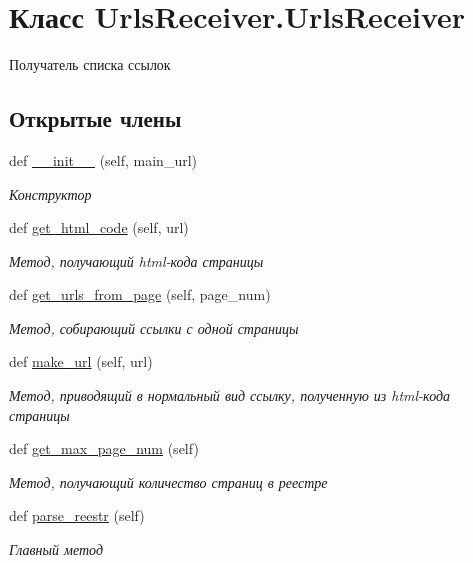 \hypertarget{classUrlsReceiver_1_1UrlsReceiver}{}\section{Класс Urls\+Receiver.\+Urls\+Receiver}
\label{classUrlsReceiver_1_1UrlsReceiver}


Получатель списка ссылок  


\subsection*{Открытые члены}
\begin{DoxyCompactItemize}
\item 
def \hyperlink{classUrlsReceiver_1_1UrlsReceiver_ae4ba1b935dce3bd30912583beca32aff}{\+\_\+\+\_\+init\+\_\+\+\_\+} (self, main\+\_\+url)
\begin{DoxyCompactList}\small\item\em Конструктор \end{DoxyCompactList}\item 
def \hyperlink{classUrlsReceiver_1_1UrlsReceiver_a448316919bfe59e35942edc34f2b674b}{get\+\_\+html\+\_\+code} (self, url)
\begin{DoxyCompactList}\small\item\em Метод, получающий html-\/кода страницы \end{DoxyCompactList}\item 
def \hyperlink{classUrlsReceiver_1_1UrlsReceiver_ace2cdcb9a1bb117d80ec0efad2b2374b}{get\+\_\+urls\+\_\+from\+\_\+page} (self, page\+\_\+num)
\begin{DoxyCompactList}\small\item\em Метод, собирающий ссылки с одной страницы \end{DoxyCompactList}\item 
def \hyperlink{classUrlsReceiver_1_1UrlsReceiver_a1dfd347420ffce5e3c510feb8a436d30}{make\+\_\+url} (self, url)
\begin{DoxyCompactList}\small\item\em Метод, приводящий в нормальный вид ссылку, полученную из html-\/кода страницы \end{DoxyCompactList}\item 
def \hyperlink{classUrlsReceiver_1_1UrlsReceiver_a871a6b2bc7d65cd8ea6184061f994592}{get\+\_\+max\+\_\+page\+\_\+num} (self)
\begin{DoxyCompactList}\small\item\em Метод, получающий количество страниц в реестре \end{DoxyCompactList}\item 
def \hyperlink{classUrlsReceiver_1_1UrlsReceiver_abf0eed73148dbb302da0b4a09efb4940}{parse\+\_\+reestr} (self)
\begin{DoxyCompactList}\small\item\em Главный метод \end{DoxyCompactList}\end{DoxyCompactItemize}
